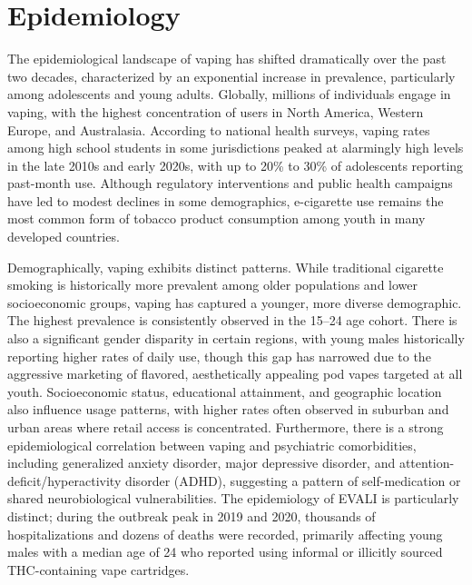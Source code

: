 \section*{Epidemiology}
The epidemiological landscape of vaping has shifted dramatically over the past two decades, characterized by an exponential increase in prevalence, particularly among adolescents and young adults. Globally, millions of individuals engage in vaping, with the highest concentration of users in North America, Western Europe, and Australasia. According to national health surveys, vaping rates among high school students in some jurisdictions peaked at alarmingly high levels in the late 2010s and early 2020s, with up to 20\% to 30\% of adolescents reporting past-month use. Although regulatory interventions and public health campaigns have led to modest declines in some demographics, e-cigarette use remains the most common form of tobacco product consumption among youth in many developed countries.

Demographically, vaping exhibits distinct patterns. While traditional cigarette smoking is historically more prevalent among older populations and lower socioeconomic groups, vaping has captured a younger, more diverse demographic. The highest prevalence is consistently observed in the 15--24 age cohort. There is also a significant gender disparity in certain regions, with young males historically reporting higher rates of daily use, though this gap has narrowed due to the aggressive marketing of flavored, aesthetically appealing pod vapes targeted at all youth. Socioeconomic status, educational attainment, and geographic location also influence usage patterns, with higher rates often observed in suburban and urban areas where retail access is concentrated. Furthermore, there is a strong epidemiological correlation between vaping and psychiatric comorbidities, including generalized anxiety disorder, major depressive disorder, and attention-deficit/hyperactivity disorder (ADHD), suggesting a pattern of self-medication or shared neurobiological vulnerabilities. The epidemiology of EVALI is particularly distinct; during the outbreak peak in 2019 and 2020, thousands of hospitalizations and dozens of deaths were recorded, primarily affecting young males with a median age of 24 who reported using informal or illicitly sourced THC-containing vape cartridges.

